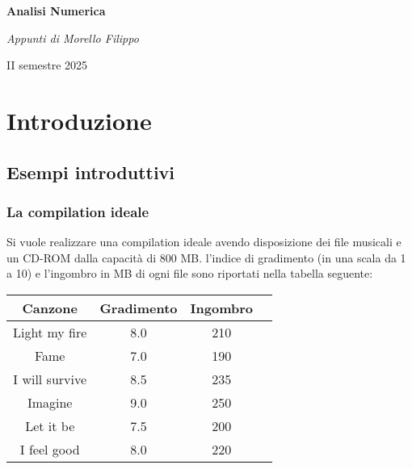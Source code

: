 \documentclass[a4paper, 11pt]{article}
\begin{document}
    \begin{titlepage}
        \centering
    
        \vspace{2cm}
        {\Huge\bfseries Analisi Numerica\par}
    
        \vspace{1cm}
        {\Large\itshape Appunti di Morello Filippo\par}
    
        \vfill
        {\large II semestre 2025\par}
    
    \end{titlepage}

    \tableofcontents

    \break
    
    \section{Introduzione}
        \subsection{Esempi introduttivi}
            \subsubsection*{La compilation ideale}
            Si vuole realizzare una compilation ideale avendo disposizione dei file musicali e un CD-ROM dalla capacità di $800$ MB. l’indice di
            gradimento (in una scala da 1 a 10) e l’ingombro in MB di ogni file sono riportati nella tabella seguente: 

            \begin{table}[ht]
                \centering
                \begin{tabular}{|c|c|c|c|}
                \hline
                \textbf{Canzone} & \textbf{Gradimento} & \textbf{Ingombro} \\ \hline
                Light my fire    & 8.0                 & 210               \\
                Fame             & 7.0                 & 190               \\
                I will survive   & 8.5                 & 235               \\
                Imagine          & 9.0                 & 250               \\
                Let it be        & 7.5                 & 200               \\
                I feel good      & 8.0                 & 220               \\ \hline
                \end{tabular}
                \end{table}
           
\end{document}
